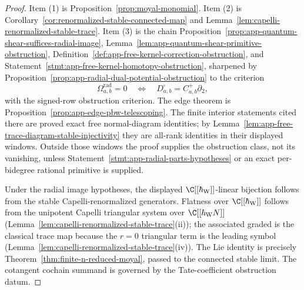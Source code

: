 \documentclass[11pt]{memoir}
\begin{document}
\begin{proof}
  Item (1) is Proposition~\ref{prop:moyal-monomial}.  Item (2) is
  Corollary~\ref{cor:renormalized-stable-connected-map} and
  Lemma~\ref{lem:capelli-renormalized-stable-trace}.  Item (3) is the
  chain
  Proposition~\ref{prop:app-quantum-shear-suffices-radial-image},
  Lemma~\ref{lem:app-quantum-shear-primitive-obstruction},
  Definition~\ref{def:app-free-kernel-correction-obstruction}, and
  Statement~\ref{stmt:app-free-kernel-homotopy-obstruction}, sharpened by
  Proposition~\ref{prop:app-radial-dual-potential-obstruction} to the
  criterion
  \[
    \Omega^{\mathrm{rad}}_{a,b}=0
    \quad\Longleftrightarrow\quad
    D^\square_{a,b}=C^+_{a,b}\partial_2,
  \]
  with the signed-row obstruction criterion.  The edge theorem is
  Proposition~\ref{prop:app-edge-pbw-telescoping}.  The finite interior
  statements cited there are proved exact free normal-diagram identities; by
  Lemma~\ref{lem:app-free-trace-diagram-stable-injectivity} they are
  all-rank identities in their displayed windows.  Outside those windows
  the proof supplies the obstruction class, not its vanishing, unless
  Statement~\ref{stmt:app-radial-parts-hypotheses} or an exact
  per-bidegree rational primitive is supplied.

  Under the radial image hypotheses, the displayed \(\C[[\hbar_{\mathrm{W}}]]\)-linear
  bijection follows from the stable Capelli-renormalized generators.
  Flatness over \(\C[[\hbar_{\mathrm{W}}]]\) follows from the unipotent Capelli
  triangular system over $\C[[\hbar_{\mathrm{W}}N]]$
  (Lemma~\ref{lem:capelli-renormalized-stable-trace}(ii)); the
  associated graded is the classical trace map because the $r=0$
  triangular term is the leading symbol
  (Lemma~\ref{lem:capelli-renormalized-stable-trace}(iv)).  The Lie
  identity is precisely Theorem~\ref{thm:finite-n-reduced-moyal}, passed
  to the connected stable limit. The cotangent cochain summand is
	  governed by the Tate-coefficient obstruction datum.
\end{proof}
\end{document}
